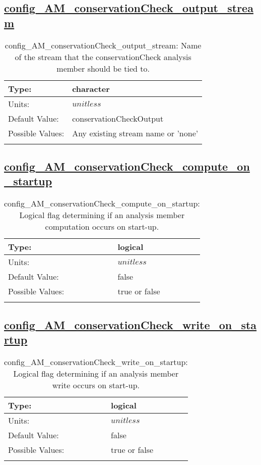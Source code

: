 \subsection[config\_AM\_conservationCheck\_output\_stream]{\hyperref[sec:nm_tab_AM_conservationCheck]{config\_AM\_conservationCheck\_output\_stream}}
\label{subsec:nm_sec_config_AM_conservationCheck_output_stream}
\begin{center}
\begin{longtable}{| p{2.0in} || p{4.0in} |}
    \hline
    Type: & character \\
    \hline
    Units: & $unitless$ \\
    \hline
    Default Value: & conservationCheckOutput \\
    \hline
    Possible Values: & Any existing stream name or 'none' \\
    \hline
    \caption{config\_AM\_conservationCheck\_output\_stream: Name of the stream that the conservationCheck analysis member should be tied to.}
\end{longtable}
\end{center}
\subsection[config\_AM\_conservationCheck\_compute\_on\_startup]{\hyperref[sec:nm_tab_AM_conservationCheck]{config\_AM\_conservationCheck\_compute\_on\_startup}}
\label{subsec:nm_sec_config_AM_conservationCheck_compute_on_startup}
\begin{center}
\begin{longtable}{| p{2.0in} || p{4.0in} |}
    \hline
    Type: & logical \\
    \hline
    Units: & $unitless$ \\
    \hline
    Default Value: & false \\
    \hline
    Possible Values: & true or false \\
    \hline
    \caption{config\_AM\_conservationCheck\_compute\_on\_startup: Logical flag determining if an analysis member computation occurs on start-up.}
\end{longtable}
\end{center}
\subsection[config\_AM\_conservationCheck\_write\_on\_startup]{\hyperref[sec:nm_tab_AM_conservationCheck]{config\_AM\_conservationCheck\_write\_on\_startup}}
\label{subsec:nm_sec_config_AM_conservationCheck_write_on_startup}
\begin{center}
\begin{longtable}{| p{2.0in} || p{4.0in} |}
    \hline
    Type: & logical \\
    \hline
    Units: & $unitless$ \\
    \hline
    Default Value: & false \\
    \hline
    Possible Values: & true or false \\
    \hline
    \caption{config\_AM\_conservationCheck\_write\_on\_startup: Logical flag determining if an analysis member write occurs on start-up.}
\end{longtable}
\end{center}
